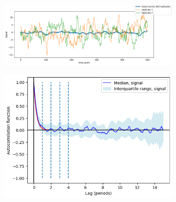 


\begin{figure}
  \centering
  \begin{subfigure}[t]{0.6\textwidth}
  \centering
    \includegraphics[width=\linewidth]{gillespie_k25_d0p05_mean.png}
    \caption{
    }
    \label{fig:acf-noiseamplitude-highk0-ts}
  \end{subfigure}%
  \begin{subfigure}[t]{0.4\textwidth}
  \centering
    \includegraphics[width=\linewidth]{gillespie_k25_d0p05_acf.png}
    \caption{
    }
    \label{fig:acf-noiseamplitude-highk0-acf}
  \end{subfigure}


\end{figure}
